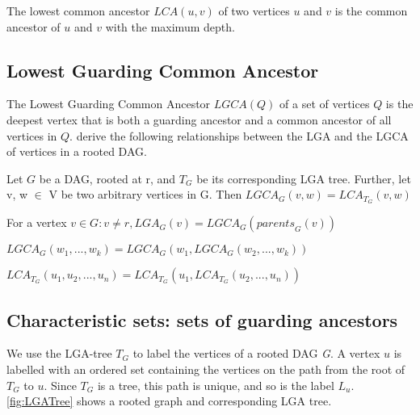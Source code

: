 \begin{definition} \label{def:LowestCommonAncestor}
	The lowest common ancestor $LCA(u,v)$ of two vertices $u$ and $v$ is the common ancestor of $u$ and $v$ with the maximum depth.
\end{definition}


\subsection{Lowest Guarding Common Ancestor} \label{LGCADefinitions}

The Lowest Guarding Common Ancestor $LGCA(Q)$ of a set of vertices $Q$ is the deepest vertex that is both a guarding ancestor and a common ancestor of all vertices in $Q$. \citet{fischer2010new} derive the following relationships between the LGA and the LGCA of vertices in a rooted DAG.


\begin{lemma}\label{lscaislca}
	Let $G$ be a DAG, rooted at r, and $T_G$ be its corresponding LGA tree. Further, let v, w $\in$ V be two arbitrary vertices in G. Then $LGCA_G(v,w) = LCA_{T_G}(v,w)$
\end{lemma}



\begin{lemma}\label{lgaislgcaofparents}
		For a vertex $v \in G: v \neq r , LGA_G(v) = LGCA_G(\mathit{parents}_G(v))$
\end{lemma}


\begin{definition}\label{associativelgca}
		$LGCA_G (w_1, ... ,w_k) = LGCA_G (w_1, LGCA_G (w_2, ... ,w_k))$
\end{definition}

\begin{definition}\label{associativelca}
	$LCA_{T_G} (u_1, u_2,..., u_n) = LCA_{T_G} (u_1, LCA_{T_G} (u_2,...,u_n))$
\end{definition}

\subsection{Characteristic sets: sets of guarding ancestors}

We use the LGA-tree $T_G$ to label the vertices of a rooted DAG \emph{G}.
A vertex $u$ is labelled with an ordered set containing the vertices on the path from the root of $T_G$ to $u$. Since $T_G$ is a tree, this path is unique, and so is the label $L_u$. \cref{fig:LGATree} shows a rooted graph and corresponding LGA tree.

